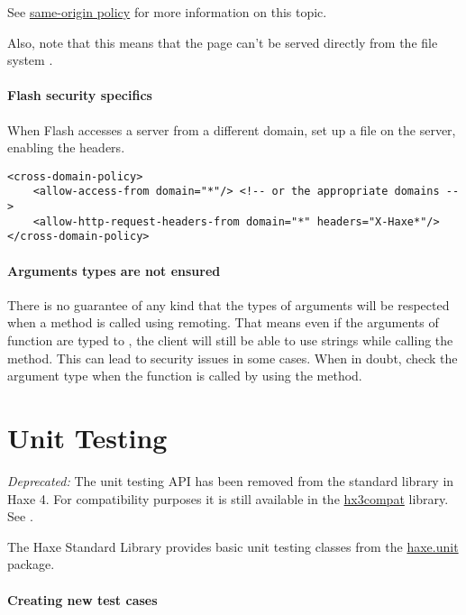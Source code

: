 See \href{http://en.wikipedia.org/wiki/Same-origin_policy}{same-origin policy} for more information on this topic.

Also, note that this means that the page can't be served directly from the file system .

\paragraph{Flash security specifics}

When Flash accesses a server from a different domain, set up a  file on the server, enabling the  headers.

\begin{lstlisting}
<cross-domain-policy>
	<allow-access-from domain="*"/> <!-- or the appropriate domains -->
	<allow-http-request-headers-from domain="*" headers="X-Haxe*"/>
</cross-domain-policy>
\end{lstlisting} 

\paragraph{Arguments types are not ensured}

There is no guarantee of any kind that the types of arguments will be respected when a method is called using remoting. 
That means even if the arguments of function  are typed to , the client will still be able to use strings while calling the method. 
This can lead to security issues in some cases. When in doubt, check the argument type when the function is called by using the  method.

\section{Unit Testing}
\label{std-unit-testing}


\emph{Deprecated:} The unit testing API has been removed from the standard library in Haxe 4. For compatibility purposes it is still available in the \href{https://github.com/HaxeFoundation/hx3compat/}{hx3compat} library. See .

The Haxe Standard Library provides basic unit testing classes from the \href{https://api.haxe.org/haxe/unit/}{haxe.unit} package. 

\paragraph{Creating new test cases}

